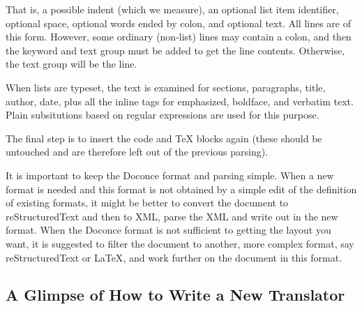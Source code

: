 \documentclass{article}
\begin{document}
That is, a possible indent (which we measure), an optional list
item identifier, optional space, optional words ended by colon,
and optional text. All lines are of this form. However, some
ordinary (non-list) lines may contain a colon, and then the keyword
and text group must be added to get the line contents. Otherwise,
the text group will be the line.

When lists are typeset, the text is examined for sections, paragraphs,
title, author, date, plus all the inline tags for emphasized, boldface,
and verbatim text. Plain subsitutions based on regular expressions
are used for this purpose.

The final step is to insert the code and TeX blocks again (these should
be untouched and are therefore left out of the previous parsing).

It is important to keep the Doconce format and parsing simple.  When a
new format is needed and this format is not obtained by a simple edit
of the definition of existing formats, it might be better to convert
the document to reStructuredText and then to XML, parse the XML and
write out in the new format.  When the Doconce format is not
sufficient to getting the layout you want, it is suggested to filter
the document to another, more complex format, say reStructuredText or
{\LaTeX}, and work further on the document in this format.

\subsection{A Glimpse of How to Write a New Translator}
\end{document}

